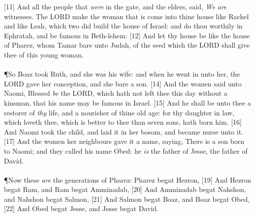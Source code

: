 [11] \textcolor[cmyk]{0.99998,1,0,0}{And all the people that \emph{were} in the gate, and the elders, said, \emph{We} \emph{are} witnesses. The LORD make the woman that is come into thine house like Rachel and like Leah, which two did build the house of Israel: and do thou worthily in Ephratah, and be famous in Beth-lehem:}
[12] \textcolor[cmyk]{0.99998,1,0,0}{And let thy house be like the house of Pharez, whom Tamar bare unto Judah, of the seed which the LORD shall give thee of this young woman.}\\
\\
\P \textcolor[cmyk]{0.99998,1,0,0}{So Boaz took Ruth, and she was his wife: and when he went in unto her, the LORD gave her conception, and she bare a son.}
[14] \textcolor[cmyk]{0.99998,1,0,0}{And the women said unto Naomi, Blessed \emph{be} the LORD, which hath not left thee this day without a kinsman, that his name may be famous in Israel.}
[15] \textcolor[cmyk]{0.99998,1,0,0}{And he shall be unto thee a restorer of \emph{thy} life, and a nourisher of thine old age: for thy daughter in law, which loveth thee, which is better to thee than seven sons, hath born him.}
[16] \textcolor[cmyk]{0.99998,1,0,0}{And Naomi took the child, and laid it in her bosom, and became nurse unto it.}
[17] \textcolor[cmyk]{0.99998,1,0,0}{And the women her neighbours gave it a name, saying, There is a son born to Naomi; and they called his name Obed: he \emph{is} the father of Jesse, the father of David.}\\
\\
\P \textcolor[cmyk]{0.99998,1,0,0}{Now these \emph{are} the generations of Pharez: Pharez begat Hezron,}
[19] \textcolor[cmyk]{0.99998,1,0,0}{And Hezron begat Ram, and Ram begat Amminadab,}
[20] \textcolor[cmyk]{0.99998,1,0,0}{And Amminadab begat Nahshon, and Nahshon begat Salmon,}
[21] \textcolor[cmyk]{0.99998,1,0,0}{And Salmon begat Boaz, and Boaz begat Obed,}
[22] \textcolor[cmyk]{0.99998,1,0,0}{And Obed begat Jesse, and Jesse begat David.}